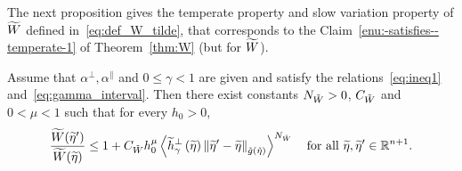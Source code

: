 \documentclass[10pt]{amsart}
\theoremstyle{definition}\newtheorem{defi}[theo]{Definition}\newtheorem{rema}[theo]{Remark}\newtheorem{exam}[theo]{Example}\newtheorem{exem}[theo]{Example}\newtheorem{nota}[theo]{Notation}
\newcommand{\bbR}{\mathbb{R}}
\let\oldtilde\tilde
\renewcommand*{\tilde}[1]{\mathchoice{\widetilde{#1}}{\widetilde{#1}}{\oldtilde{#1}}{\oldtilde{#1}}}
\begin{document}
The next proposition gives the temperate property and slow variation property of $\tilde{W}$ defined in~\eqref{eq:def_W_tilde}, that corresponds to the Claim~\ref{enu:-satisfies--temperate-1} of Theorem~\ref{thm:W} (but for $\tilde{W}$).

\begin{cBoxB}{}
\begin{prop}
Assume that $\alpha^{\perp},\alpha^{\parallel}$ and $0\leq\gamma<1$ are given and satisfy the relations~\eqref{eq:ineq1} and~\eqref{eq:gamma_interval}. Then there exist constants $N_{\tilde{W}}>0$, $C_{\tilde{W}}$ and $0<\mu<1$ such that for every $h_{0}>0$,
\begin{align}\label{eq:w2}
\frac{\tilde{W}(\tilde{\eta}')}{\tilde{W}(\tilde{\eta})}\le1+C_{\tilde{W}}h_{0}^{\mu}\left\langle\tilde{h}_{\gamma}^{\perp}\left(\tilde{\eta}\right)\left\|\tilde{\eta}'-\tilde{\eta}\right\|_{\tilde{g}\left(\tilde{\eta}\right)}\right\rangle^{N_{\tilde{W}}}\quad\text{for all }\tilde{\eta},\tilde{\eta}'\in\bbR^{n+1}.
\end{align}
\end{prop}
\end{cBoxB}
\end{document}
